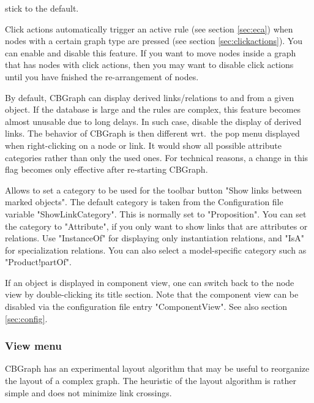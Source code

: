 \begin{description}
stick to the default.
\item[Enable Click Actions:] Click actions automatically trigger an active rule
(see section \ref{sec:eca}) when nodes with a certain graph type are pressed
(see section \ref{sec:clickactions}).
You can enable and disable this feature. If you want to move nodes inside a
graph that has nodes with click actions, then you may want to disable click actions
until you have fnished the re-arrangement of nodes.
\item[Enable Derived Links:] By default, CBGraph can display derived links/relations
to and from a given object. If the database is large and the rules are complex, 
this feature becomes almost unusable due to long delays. In such case, disable the
display of derived links. The behavior of CBGraph is then different wrt.\ the
pop menu displayed when right-clicking on a node or link. It would show all possible
attribute categories rather than only the used ones. For technical reasons, a change
in this flag becomes only effective after re-starting CBGraph.
\item[Set Link Category:] Allows to set a category to be used for the toolbar button
"Show links between marked objects". The default category is taken from the Configuration file
variable "ShowLinkCategory". This is normally set to "Proposition".
You can set the category to "Attribute", if you only want to show links that are attributes
or relations. Use "InstanceOf" for displaying only instantiation relations, and "IsA" for
specialization relations. You can also select a model-specific category such as
"Product!partOf". 


\end{description}


If an object is displayed in component view, one can switch back to the node
view by double-clicking its title section. Note that the component view can be disabled
via the configuration file entry "ComponentView". See also section \ref{sec:config}.

\subsubsection{View menu}

CBGraph has an experimental layout algorithm that may be useful
to reorganize the layout of a complex graph. The heuristic of the layout
algorithm is rather simple and does not minimize link crossings.

